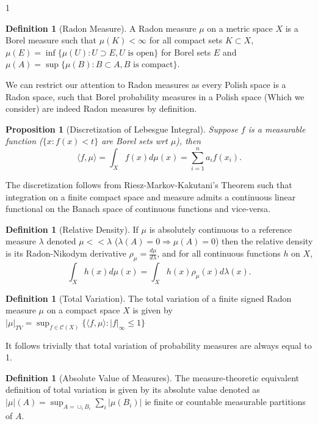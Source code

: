 \documentclass[12pt]{article}
\newtheorem{proposition}[theorem]{Proposition}
\theoremstyle{definition}
\newtheorem{definition}[theorem]{Definition}
\theoremstyle{plain}
\begin{document}
\begin{spacing}{1}
\begin{definition}[Radon Measure]
A Radon measure $\mu$ on a metric space $X$ is a Borel measure such that $\mu(K) < \infty$ for all compact sets $K \subset X$, $\mu(E) = \inf\{\mu(U): U \supset E, U \text{ is open}\}$ for Borel sets $E$ and $\mu(A) = \sup\{\mu(B): B \subset A, B \text{ is compact}\}$.
\end{definition}

We can restrict our attention to Radon measures as every Polish space is a Radon space, such that Borel probability measures in a Polish space (Which we consider) are indeed Radon measures by definition.

\begin{proposition}[Discretization of Lebesgue Integral]
    Suppose $f$ is a measurable function ($\{x: f(x) < t\}$ are Borel sets wrt $\mu$), then 
    \[
    \langle f, \mu \rangle = \displaystyle \int_X f(x)d\mu(x) = \sum_{i = 1}^n a_i f(x_i).
    \]
\end{proposition}

The discretization follows from Riesz-Markov-Kakutani's Theorem such that integration on a finite compact space and measure admits a continuous linear functional on the Banach space of continuous functions and vice-versa.

\begin{definition}[Relative Density]
    If $\mu$ is absolutely continuous to a reference measure $\lambda$ denoted $\mu << \lambda$ ($\lambda(A) = 0 \Rightarrow \mu(A) = 0$) then the relative density is its Radon-Nikodym derivative $\rho_\mu = \frac{d\mu}{d\lambda}$, and for all continuous functions $h$ on $X$, 
    \[
    \displaystyle \int_X h(x)d\mu(x) = \displaystyle \int_X h(x) \rho_\mu(x) d\lambda(x).
    \]
\end{definition}

\begin{definition}[Total Variation]
    The total variation of a finite signed Radon measure $\mu$ on a compact space $X$ is given by $\lvert \mu \rvert_{TV} = \sup_{f \in \mathcal{C}(X)}\{\langle f, \mu \rangle: \lvert f \rvert _\infty \leq 1\}$
\end{definition}

It follows trivially that total variation of probability measures are always equal to 1.

\begin{definition}[Absolute Value of Measures]
    The measure-theoretic equivalent definition of total variation is given by its absolute value denoted as $\lvert \mu \rvert (A) = \sup_{A = \cup_i B_i} \sum_i \lvert \mu(B_i) \rvert$ ie finite or countable measurable partitions of $A$.
\end{definition}


\end{spacing}
\end{document}
